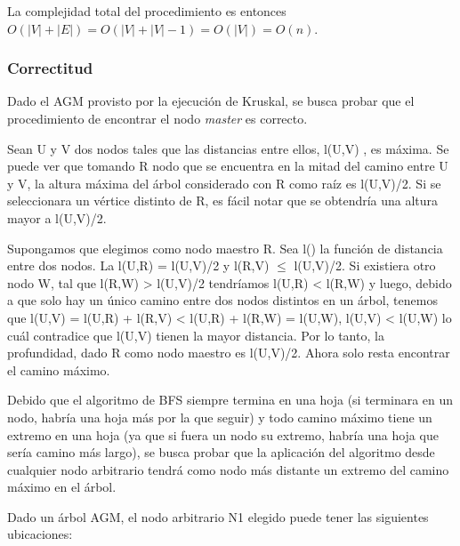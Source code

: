 \documentclass[a4paper, 10pt, twoside]{article}
\begin{document}
La complejidad total del procedimiento es entonces $O(|V| + |E|) = O(|V| + |V| - 1) = O(|V|) = O(n)$.


\subsubsection{Correctitud}

Dado el AGM provisto por la ejecución de Kruskal, se busca probar que el procedimiento de encontrar el nodo \textit{master} es correcto.

Sean U y V dos nodos tales que las distancias entre ellos, l(U,V) , es máxima. Se puede ver que tomando R nodo que se encuentra en la mitad del camino entre U y V, la altura máxima del árbol considerado con R como raíz es l(U,V)/2. Si se seleccionara un vértice distinto de R, es fácil notar que se obtendría una altura mayor a l(U,V)/2.

Supongamos que elegimos como nodo maestro R. Sea l() la función de distancia entre dos nodos. La l(U,R) = l(U,V)/2 y l(R,V) $\leq$ l(U,V)/2. Si existiera otro nodo W, tal que l(R,W) > l(U,V)/2 tendríamos l(U,R) < l(R,W) y luego, debido a que solo hay un único camino entre dos nodos distintos en un árbol, tenemos que l(U,V) = l(U,R) + l(R,V) < l(U,R) + l(R,W) = l(U,W), l(U,V) < l(U,W) lo cuál contradice que l(U,V) tienen la mayor distancia. Por lo tanto, la profundidad, dado R como nodo maestro es l(U,V)/2. Ahora solo resta encontrar el camino máximo.

Debido que el algoritmo de BFS siempre termina en una hoja (si terminara en un nodo, habría una hoja más por la que seguir) y todo camino máximo tiene un extremo en una hoja (ya que si fuera un nodo su extremo, habría una hoja que sería camino más largo), se busca probar que la aplicación del algoritmo desde cualquier nodo arbitrario tendrá como nodo más distante un extremo del camino máximo en el árbol.

Dado un árbol AGM, el nodo arbitrario N1 elegido puede tener las siguientes ubicaciones:
\end{document}
